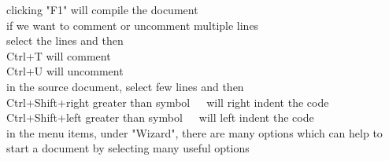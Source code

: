 \documentclass[12pt]{article}
\begin{document}
clicking "F1" will compile the document\\

if we want to comment or uncomment multiple lines\\
select the lines and then\\
Ctrl+T will comment\\
Ctrl+U will uncomment\\

in the source document, select few lines and then\\
Ctrl+Shift+right greater than symbol \,\,\,\,\, will right indent the code\\
Ctrl+Shift+left greater than symbol \,\,\,\,\, will left indent the code\\

in the menu items, under "Wizard", there are many options which can help to start a document by selecting many useful options\\
\end{document}
